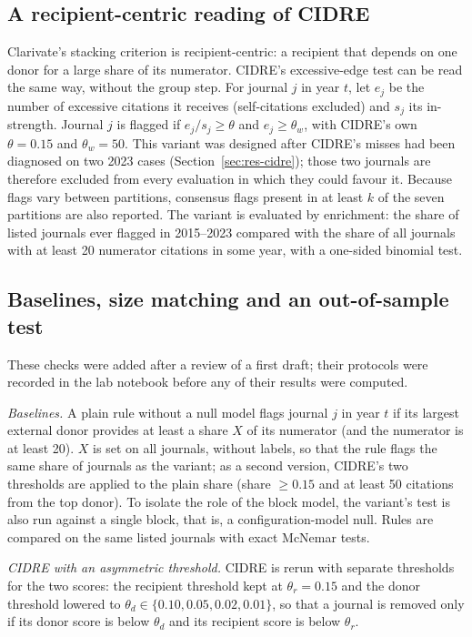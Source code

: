 \subsection{A recipient-centric reading of CIDRE}
Clarivate's stacking criterion is recipient-centric: a recipient that depends on one donor for a large share of its
numerator. CIDRE's excessive-edge test can be read the same way, without the group step. For journal $j$ in year
$t$, let $e_j$ be the number of excessive citations it receives (self-citations excluded) and $s_j$ its in-strength.
Journal $j$ is flagged if $e_j/s_j \ge \theta$ and $e_j \ge \theta_w$, with CIDRE's own $\theta=0.15$ and $\theta_w=50$. This
variant was designed after CIDRE's misses had been diagnosed on two 2023 cases (Section~\ref{sec:res-cidre}); those two
journals are therefore excluded from every evaluation in which they could favour it. Because flags vary between
partitions, consensus flags present in at least $k$ of the seven partitions are also reported. The variant is evaluated by enrichment: the share of listed journals ever flagged in 2015--2023 compared with the share of all journals with at
least 20 numerator citations in some year, with a one-sided binomial test.

\subsection{Baselines, size matching and an out-of-sample test}\label{sec:m-robust}
These checks were added after a review of a first draft; their protocols were recorded in the lab notebook
before any of their results were computed.

\emph{Baselines.} A plain rule without a null model flags journal $j$ in year $t$ if its largest external donor
provides at least a share $X$ of its numerator (and the numerator is at least 20). $X$ is set on all journals, without
labels, so that the rule flags the same share of journals as the variant; as a second version, CIDRE's two thresholds are applied to the plain share (share $\ge0.15$ and at least 50 citations from the top donor). To isolate the role of
the block model, the variant's test is also run against a single block, that is, a configuration-model null. Rules are
compared on the same listed journals with exact McNemar tests.

\emph{CIDRE with an asymmetric threshold.} CIDRE is rerun with separate thresholds for the two scores: the recipient
threshold kept at $\theta_r=0.15$ and the donor threshold lowered to $\theta_d\in\{0.10,0.05,0.02,0.01\}$, so that a
journal is removed only if its donor score is below $\theta_d$ and its recipient score is below $\theta_r$.

